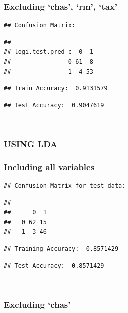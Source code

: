 \documentclass[]{article}
\begin{document}
\subsubsection{\texorpdfstring{Excluding `chas', `rm',
`tax'}{Excluding chas, rm, tax}}\label{excluding-chas-rm-tax}

\begin{verbatim}
## Confusion Matrix:
\end{verbatim}

\begin{verbatim}
##                 
## logi.test.pred_c  0  1
##                0 61  8
##                1  4 53
\end{verbatim}

\begin{verbatim}
## Train Accuracy:  0.9131579
\end{verbatim}

\begin{verbatim}
## Test Accuracy:  0.9047619
\end{verbatim}

~

\newpage

\subsubsection{USING LDA}\label{using-lda}

\subsubsection{Including all variables}\label{including-all-variables-1}

\begin{verbatim}
## Confusion Matrix for test data:
\end{verbatim}

\begin{verbatim}
##    
##      0  1
##   0 62 15
##   1  3 46
\end{verbatim}

\begin{verbatim}
## Training Accuracy:  0.8571429
\end{verbatim}

\begin{verbatim}
## Test Accuracy:  0.8571429
\end{verbatim}

~

\subsubsection{\texorpdfstring{Excluding
`chas'}{Excluding chas}}\label{excluding-chas-1}
\end{document}
